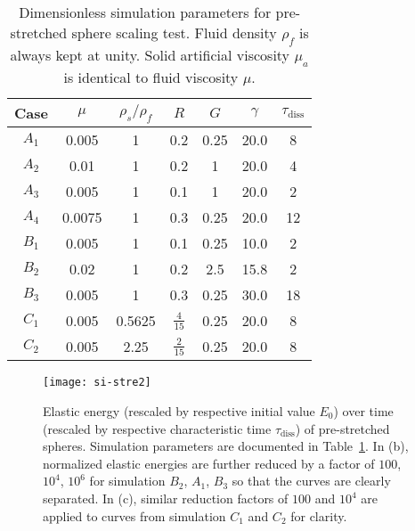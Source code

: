 \documentclass[times, 10pt]{article}
\begin{document}
   	        \begin{table}\centering
                \caption{Dimensionless simulation parameters for pre-stretched sphere scaling test. Fluid density $\rho_f$ is always kept at unity. Solid artificial viscosity $\mu_a$ is identical to fluid viscosity $\mu$.}
                \label{table:str_params}
                \begin{tabular} { c || c | c | c | c || c | c}
                    \hline
                    Case       	& $\mu$ & $\rho_s/\rho_f$ & $R$ & $G$  & $\gamma$  & $\tau_\text{diss}$ \\ \hline
                    $A_1$	& 0.005     &	1	& 0.2   & 0.25  & 20.0	& 8 \\ \hline
                    $A_2$	& 0.01      &	1	& 0.2   & 1     & 20.0 	& 4 \\ \hline
                    $A_3$	& 0.005     &	1	& 0.1   &  1    & 20.0 	& 2 \\ \hline
                    $A_4$	& 0.0075    &	1	& 0.3   & 0.25  & 20.0	& 12 \\ \hline
                    \hline
                    $B_1$	& 0.005 &   1   & 0.1   & 0.25 & 10.0  & 2 \\ \hline
                    $B_2$	& 0.02  &	1	& 0.2   & 2.5  & 15.8 	& 2 \\ \hline
                    $B_3$	& 0.005 &	1	& 0.3   & 0.25 & 30.0 	& 18 \\ \hline
                    \hline
                    $C_1$	& 0.005 &   0.5625  & $\tfrac{4}{15}$   & 0.25  & 20.0  & 8 \\ \hline
                    $C_2$	& 0.005  &	2.25    & $\tfrac{2}{15}$   & 0.25 	& 20.0 	& 8 \\ \hline
                 \end{tabular}
            \end{table}

            \begin{figure}
            \centering
                \texttt{[image: si-stre2]}
                \caption{ Elastic energy (rescaled by respective initial value $E_0$) over time (rescaled by respective characteristic time $\tau_\text{diss}$) of pre-stretched spheres.
                 Simulation parameters are documented in Table~\ref{table:str_params}.
                 In (b), normalized elastic energies are further reduced by a factor of $100$, $10^4$, $10^6$ for simulation $B_2$, $A_1$, $B_3$
                 so that the curves are clearly separated.
                 In (c), similar reduction factors of $100$ and $10^4$ are applied to curves from simulation $C_1$ and $C_2$ for clarity.
                }
                \label{fig:str_scaling}
            \end{figure}
\end{document}
